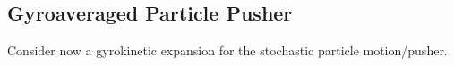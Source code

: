 \subsection{Gyroaveraged Particle Pusher}\label{cha:gyroaveraging}
    Consider now a gyrokinetic expansion for the stochastic particle motion/pusher.


    
    
    